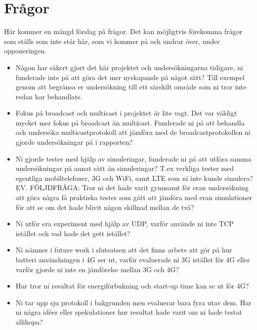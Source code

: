 \documentclass{article}
\begin{document}
\section{Frågor}
Här kommer en mängd förslag på frågor. Det kan möjligtvis förekomma frågor som ställs som inte står här, som vi kommer på och undrar över, under opponeringen.

\begin{itemize}
\item Någon har säkert gjort det här projektet och undersökningarna tidigare, ni funderade inte på att göra det mer nyskapande på något sätt? Till exempel genom att begränsa er undersökning till ett särskilt område som ni tror inte redan har behandlats.

\item Fokus på broadcast och multicast i projektet är lite vagt. Det var väldigt mycket mer fokus på broadcast än multicast. Funderade ni på att behandla och undersöka multicastprotokoll att jämföra med de broadcastprotokollen ni gjorde undersökningar på i rapporten?

\item Ni gjorde tester med hjälp av simuleringar, funderade ni på att utföra samma undersökningar på annat sätt än simuleringar? T.ex verkliga tester med egentliga mobiltelefoner, 3G och WiFi, samt LTE som ni inte kunde simulera? 
EV. FÖLJDFRÅGA: Tror ni det hade varit gynnsamt för eran undersökning att göra några få praktiska tester som gått att jämföra med eran simulationer för att se om det hade blivit någon skillnad mellan de två?

\item Ni utför era experiment med hjälp av UDP, varför använde ni inte TCP istället och vad hade det gett istället?

\item Ni nämner i future work i slutsatsen att det finns arbete att gör på hur batteri användningen i 4G ser ut, varför evaluerade ni 3G istället för 4G eller varför gjorde ni inte en jämförelse mellan 3G och 4G? 

\item Hur tror ni resultat för energiförbukning och start-up time kan se ut för 4G?

\item Ni tar upp sju protokoll i bakgrunden men evaluerar bara fyra utav dem. Har ni några idéer eller spekulationer hur resultat hade varit om ni hade testat allihopa?
\end{itemize}
\end{document}
